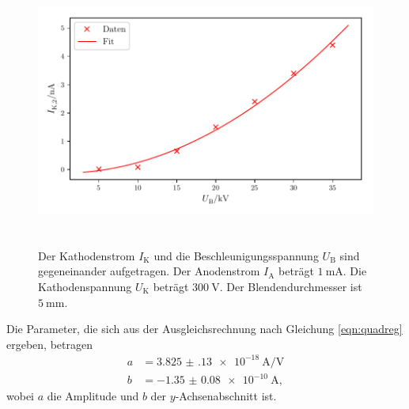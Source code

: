 \begin{figure}
    \centering
    \includegraphics[width=15cm, height=9cm]{build/plot4.pdf}
    \caption{Der Kathodenstrom $I_\text{K}$ und die Beschleunigungsspannung $U_\text{B}$ sind gegeneinander aufgetragen. Der Anodenstrom $I_\text{A}$ beträgt $\SI{1}{\milli\ampere}$. Die Kathodenspannung $U_\text{K}$ beträgt $\SI{300}{\volt}$. Der Blendendurchmesser ist $\SI{5}{\milli\meter}.$}
    \label{fig:plot4}
\end{figure}

\noindent Die Parameter, die sich aus der Ausgleichsrechnung nach Gleichung \eqref{eqn:quadreg} ergeben, betragen
\begin{align*}
    a &= \SI{3.825(130)e-18}{\ampere\per\volt}\\
    b &= \SI{-1.35(8)e-10}{\ampere},
\end{align*}
wobei $a$ die Amplitude und $b$ der $y$-Achsenabschnitt ist.

